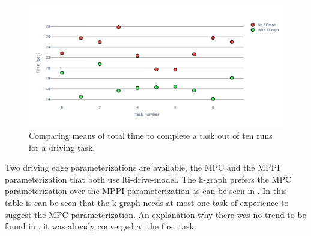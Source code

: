 \begin{figure}[H]
    \centering
    \includegraphics[width=\textwidth]{figures/results/random_drive_time_vs}
    \caption{Comparing means of total time to complete a task out of ten runs for a driving task.}\label{fig:random_drive_time_vs}
\end{figure}

Two driving edge parameterizations are available, the \ac{MPC} and the \ac{MPPI} parameterization that both use lti-drive-model. The \ac{k-graph} prefers the \ac{MPC} parameterization over the \ac{MPPI} parameterization as can be seen in . In this table is can be seen that the \ac{k-graph} needs at most one task of experience to suggest the \ac{MPC} parameterization. An explanation why there was no trend to be found in , it was already converged at the first task.  

